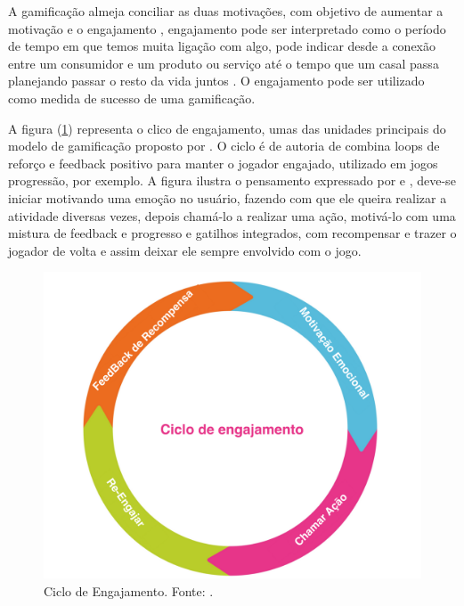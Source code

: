 A gamificação almeja conciliar as duas motivações, com objetivo de aumentar a motivação e o engajamento \cite{muntean2011raising}, engajamento pode ser interpretado como o período de tempo em que temos muita ligação com algo, pode indicar desde a conexão entre um consumidor e um produto ou serviço até o tempo que um casal passa planejando passar o resto da vida juntos \cite{zichermann2011gamification}. O engajamento pode ser utilizado como medida de sucesso de uma gamificação. 


A figura (\ref{ciclofig}) representa o clico de engajamento, umas das unidades principais do modelo de gamificação proposto por \cite{kumar2013gamification}. O ciclo é de autoria de \cite{amy} combina loops de reforço e feedback positivo para manter o jogador engajado, utilizado em jogos progressão, por exemplo. A figura ilustra o pensamento expressado por \cite{amy} e \cite{kumar2013gamification}, deve-se iniciar motivando uma emoção no usuário, fazendo com que ele queira realizar a atividade diversas vezes, depois chamá-lo a realizar uma ação, motivá-lo com uma mistura de feedback e progresso e gatilhos integrados, com recompensar e trazer o jogador de volta e assim deixar ele sempre envolvido com o jogo. 

\begin{figure}[h]
	\centering
		\includegraphics[keepaspectratio=true,scale=0.3]{figuras/ciclofig.png}
	\caption{Ciclo de Engajamento. Fonte: \cite{kumar2013gamification}.\label{ciclofig}
}
\end{figure}


